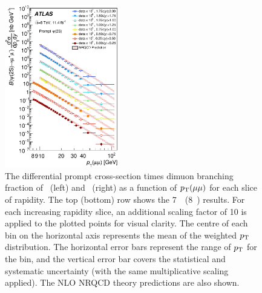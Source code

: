 \begin{description}[style=unboxed,leftmargin=0cm]
\begin{figure} [!ht]
\begin{center}
    \includegraphics[width=0.44\textwidth]{figures/ct_8TeV_Psi2SP_xSec.eps}\hfil
    \caption{The differential prompt cross-section times dimuon branching fraction of \jpsi\ (left) and \psiprime\ (right) as a function 
    of $\mbox{$p_{\text{T}}$}(\mu\mu)$ for each slice of rapidity. 
    The top (bottom) row shows the 7~\TeV\ (8~\TeV) results.
    For each increasing rapidity slice, an additional scaling factor of 10 is applied to the plotted points for visual clarity. The
      centre of each bin on the horizontal axis represents the mean of the weighted $\mbox{$p_{\text{T}}$}$ distribution. The
      horizontal error bars represent the range of $\mbox{$p_{\text{T}}$}$ for the bin, and the vertical error bar covers 
      the statistical and systematic 
      uncertainty (with the same multiplicative scaling applied). 
      The NLO NRQCD theory predictions are also shown.}
    \label{fig:res:xSecP}
  \end{center}
\end{figure} 


\end{description}
